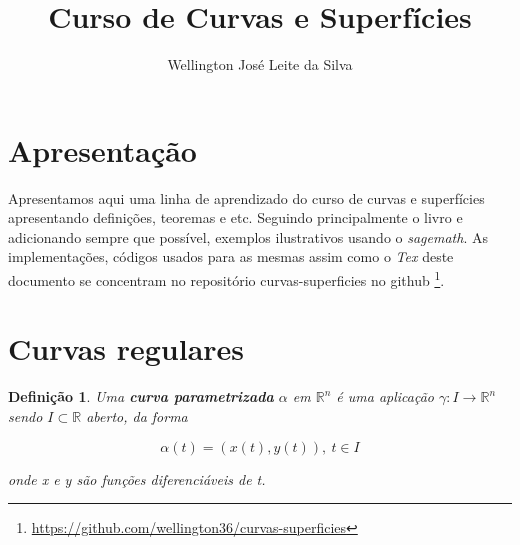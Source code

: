 \documentclass[12pt]{article}
\title{Curso de Curvas e Superfícies}
\author{Wellington José Leite da Silva\inst{1}}
\date{}
\newtheorem{definition}{Definição}
\newcommand{\furl}[1]{\footnote{\url{#1}}}
\begin{document}
\maketitle


\section*{Apresentação}\label{s1}
Apresentamos aqui uma linha de aprendizado do curso de curvas e superfícies apresentando definições, teoremas e etc. Seguindo principalmente o livro \cite{bookmain} e adicionando sempre que possível, exemplos ilustrativos usando o \textit{sagemath}. As implementações, códigos usados para as mesmas  assim como o \textit{Tex} deste documento se concentram no repositório curvas-superficies no github \furl{https://github.com/wellington36/curvas-superficies}.

\section{Curvas regulares}\label{s2}

\begin{definition}
Uma \textbf{curva parametrizada} $\alpha$ em $\mathbb{R}^n$ é uma aplicação $\gamma: I \rightarrow \mathbb{R}^n$ sendo $I \subset \mathbb{R}$ aberto, da forma

$$\alpha(t) = (x(t), y(t)),\ t\in I$$

onde x e y são funções diferenciáveis de t.
\end{definition}
\end{document}
